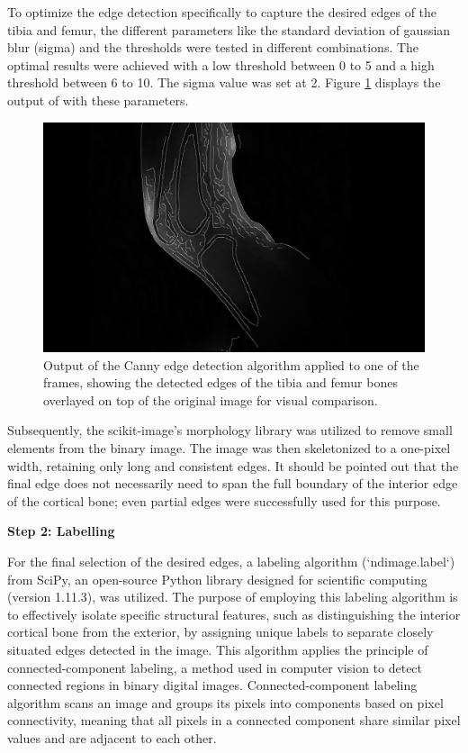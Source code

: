 \documentclass{micro-econ-thesis}
\begin{document}
To optimize the edge detection specifically to capture the desired edges of the tibia and femur, the different parameters like the standard deviation of gaussian blur (sigma) and the thresholds were tested in different combinations. The optimal results were achieved with a low threshold between 0 to 5 and a high threshold between 6 to 10. The sigma value was set at 2. Figure \ref{fig:edgemitimg} displays the output of with these parameters.  
\begin{figure}[H]
	\centering
	\includegraphics[width=0.7\linewidth]{edge_new}
	\caption{Output of the Canny edge detection algorithm applied to one of the frames, showing the detected edges of the tibia and femur bones overlayed on top of the original image for visual comparison.}
	\label{fig:edgemitimg}
\end{figure}


Subsequently, the scikit-image's morphology library was utilized to remove small elements from the binary image. The image was then skeletonized to a one-pixel width, retaining only long and consistent edges. It should be pointed out that the final edge does not necessarily need to span the full boundary of the interior edge of the cortical bone; even partial edges were successfully used for this purpose.  

\textbf{Step 2: Labelling}

For the final selection of the desired edges, a labeling algorithm (`ndimage.label`) from SciPy, an open-source Python library designed for scientific computing (version 1.11.3), was utilized. The purpose of employing this labeling algorithm is to effectively isolate specific structural features, such as distinguishing the interior cortical bone from the exterior, by assigning unique labels to separate closely situated edges detected in the image. This algorithm applies the principle of connected-component labeling,  a method used in computer vision to detect connected regions in binary digital images. Connected-component labeling algorithm scans an image and groups its pixels into components based on pixel connectivity, meaning that all pixels in a connected component share similar pixel values and are adjacent to each other.
\end{document}
